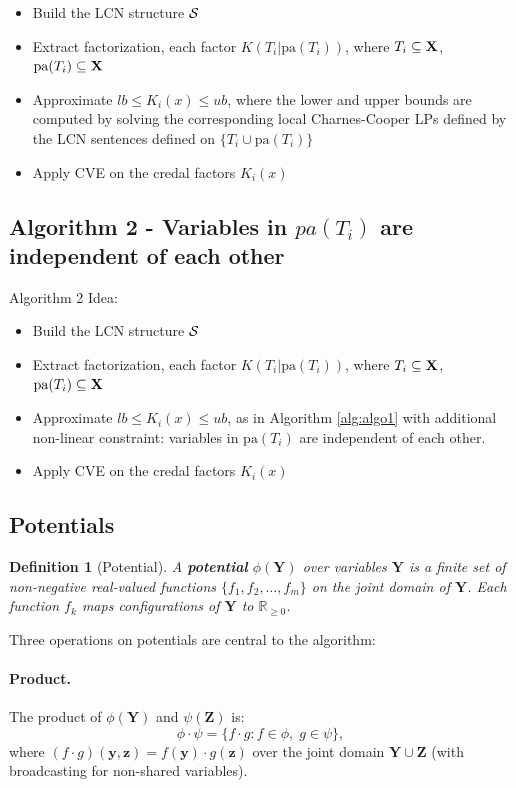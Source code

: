 \documentclass{article}
\newtheorem{definition}{Definition}
\begin{document}
\begin{itemize}
    \item Build the LCN structure $\mathcal{S}$
    \item Extract factorization, each factor $K(T_i|\mbox{pa}(T_i))$, where $T_i \subseteq \mathbf{X}$, $\mbox{pa}(T_i) \subseteq \mathbf{X}$
    \item Approximate $lb \leq K_i(x) \leq ub$, where the lower and upper bounds are computed by solving the corresponding local Charnes-Cooper LPs defined by the LCN sentences defined on $\{T_i \cup \mbox{pa}(T_i)\}$
    \item Apply CVE on the credal factors $K_i(x)$
\end{itemize}

\subsection{Algorithm 2 - Variables in $pa(T_i)$ are independent of each other}
Algorithm 2 Idea:
\begin{itemize}
    \item Build the LCN structure $\mathcal{S}$
    \item Extract factorization, each factor $K(T_i|\mbox{pa}(T_i))$, where $T_i \subseteq \mathbf{X}$, $\mbox{pa}(T_i) \subseteq \mathbf{X}$
    \item Approximate $lb \leq K_i(x) \leq ub$, as in Algorithm \ref{alg:algo1} with additional non-linear constraint: variables in $\mbox{pa}(T_i)$ are independent of each other.
    \item Apply CVE on the credal factors $K_i(x)$
\end{itemize}


\subsection{Potentials}

\begin{definition}[Potential]
A \textbf{potential} $\phi(\mathbf{Y})$ over variables $\mathbf{Y}$ is a finite set
of non-negative real-valued functions $\{f_1, f_2, \dots, f_m\}$ on the joint domain
of $\mathbf{Y}$. Each function $f_k$ maps configurations of $\mathbf{Y}$ to
$\mathbb{R}_{\geq 0}$.
\end{definition}

Three operations on potentials are central to the algorithm:

\paragraph{Product.}
The product of $\phi(\mathbf{Y})$ and $\psi(\mathbf{Z})$ is:
\[
  \phi \cdot \psi = \{f \cdot g : f \in \phi, \; g \in \psi\},
\]
where $(f \cdot g)(\mathbf{y}, \mathbf{z}) = f(\mathbf{y}) \cdot g(\mathbf{z})$
over the joint domain $\mathbf{Y} \cup \mathbf{Z}$ (with broadcasting for
non-shared variables).
\end{document}
